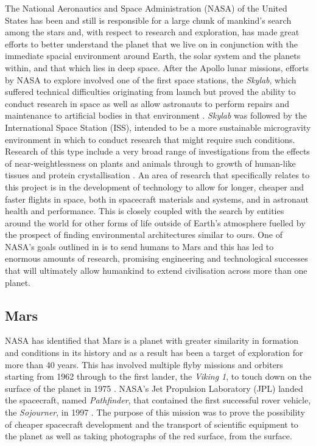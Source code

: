       The National Aeronautics and Space Administration (NASA) of the United States has been and still is responsible for a large chunk of mankind's search among the stars and, with respect to research and exploration, has made great efforts to better understand the planet that we live on in conjunction with the immediate spacial environment around Earth, the solar system and the planets within, and that which lies in deep space. After the Apollo lunar missions, efforts by NASA to explore involved one of the first space stations, the \textit{Skylab}, which suffered technical difficulties originating from launch but proved the ability to conduct research in space as well as allow astronauts to perform repairs and maintenance to artificial bodies in that environment \cite{compton1983living}. \textit{Skylab} was followed by the International Space Station (ISS), intended to be a more sustainable microgravity environment in which to conduct research that might require such conditions. Research of this type include a very broad range of investigations from the effects of near-weightlessness on plants and animals through to growth of human-like tissues and protein crystallisation \cite{nasaresearch}. An area of research that specifically relates to this project is in the development of technology to allow for longer, cheaper and faster flights in space, both in spacecraft materials and systems, and in astronaut health and performance. This is closely coupled with the search by entities around the world for other forms of life outside of Earth's atmosphere fuelled by the prospect of finding environmental architectures similar to ours. One of NASA's goals outlined in \cite{nasa2010act} is to send humans to Mars and this has led to enormous amounts of research, promising engineering and technological successes that will ultimately allow humankind to extend civilisation across more than one planet.
    
    \subsection{Mars} 
      NASA has identified that Mars is a planet with greater similarity in formation and conditions in its history and as a result has been a target of exploration for more than 40 years. This has involved multiple flyby missions and orbiters starting from 1962 through to the first lander, the \textit{Viking 1}, to touch down on the surface of the planet in 1975 \cite{marsprogram2008}. NASA's Jet Propulsion Laboratory (JPL) landed the spacecraft, named \textit{Pathfinder}, that contained the first successful rover vehicle, the \textit{Sojourner}, in 1997 \cite{pathfindersojournerjpl}. The purpose of this mission was to prove the possibility of cheaper spacecraft development and the transport of scientific equipment to the planet as well as taking photographs of the red surface, from the surface. 
    
